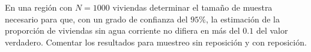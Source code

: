 
\question En una región con $N = 1000$ viviendas determinar el tamaño de muestra necesario para que,
con un grado de confianza del $95\%$, la estimación de la proporción de viviendas sin agua
corriente no difiera en más del $0.1$ del valor verdadero. Comentar los resultados para
muestreo sin reposición y con reposición.